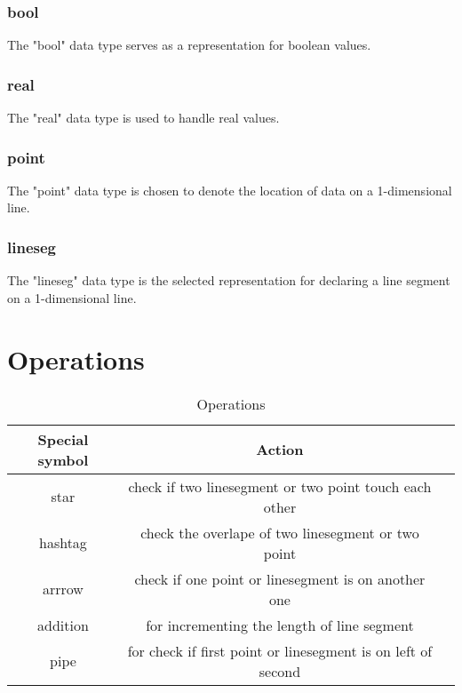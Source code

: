 \documentclass{article}
\begin{document}
\subsubsection{bool}
\begin{description}[leftmargin=1cm]
  \item[Usage:] The "bool" data type serves as a representation for boolean values.
\end{description}

\subsubsection{real}
\begin{description}[leftmargin=1cm]
  \item[Usage:] The "real" data type is used to handle real values.
\end{description}

\subsubsection{point}
\begin{description}[leftmargin=1cm]
  \item[Usage:] The "point" data type is chosen to denote the location of data on a 1-dimensional line.
\end{description}

\subsubsection{lineseg}
\begin{description}[leftmargin=1cm]
  \item[Usage:] The "lineseg" data type is the selected representation for declaring a line segment on a 1-dimensional line.
\end{description}

\section{Operations}
\begin{table}[h!]
  \centering
  \caption{Operations}
  \label{tab:Operations}
  \begin{tabular}{|c|c|c|}
  \hline
  Special symbol & Action  \\
  \hline
  star &  check if  two linesegment or two point touch each other \\
  hashtag & check the overlape of two linesegment or two point  \\
  arrrow &  check if one point or linesegment is on another one\\
  addition & for incrementing the length of line segment \\
  pipe & for check if first point or linesegment is on left of second \\
  \hline
  \end{tabular}
  \end{table}
\end{document}
